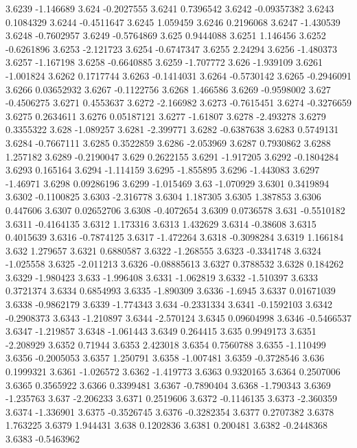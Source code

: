 3.6239  -1.146689
3.624  -0.2027555
3.6241  0.7396542
3.6242  -0.09357382
3.6243  0.1084329
3.6244  -0.4511647
3.6245  1.059459
3.6246  0.2196068
3.6247  -1.430539
3.6248  -0.7602957
3.6249  -0.5764869
3.625  0.9444088
3.6251  1.146456
3.6252  -0.6261896
3.6253  -2.121723
3.6254  -0.6747347
3.6255  2.24294
3.6256  -1.480373
3.6257  -1.167198
3.6258  -0.6640885
3.6259  -1.707772
3.626  -1.939109
3.6261  -1.001824
3.6262  0.1717744
3.6263  -0.1414031
3.6264  -0.5730142
3.6265  -0.2946091
3.6266  0.03652932
3.6267  -0.1122756
3.6268  1.466586
3.6269  -0.9598002
3.627  -0.4506275
3.6271  0.4553637
3.6272  -2.166982
3.6273  -0.7615451
3.6274  -0.3276659
3.6275  0.2634611
3.6276  0.05187121
3.6277  -1.61807
3.6278  -2.493278
3.6279  0.3355322
3.628  -1.089257
3.6281  -2.399771
3.6282  -0.6387638
3.6283  0.5749131
3.6284  -0.7667111
3.6285  0.3522859
3.6286  -2.053969
3.6287  0.7930862
3.6288  1.257182
3.6289  -0.2190047
3.629  0.2622155
3.6291  -1.917205
3.6292  -0.1804284
3.6293  0.165164
3.6294  -1.114159
3.6295  -1.855895
3.6296  -1.443083
3.6297  -1.46971
3.6298  0.09286196
3.6299  -1.015469
3.63  -1.070929
3.6301  0.3419894
3.6302  -0.1100825
3.6303  -2.316778
3.6304  1.187305
3.6305  1.387853
3.6306  0.447606
3.6307  0.02652706
3.6308  -0.4072654
3.6309  0.0736578
3.631  -0.5510182
3.6311  -0.4164135
3.6312  1.173316
3.6313  1.432629
3.6314  -0.38608
3.6315  0.4015639
3.6316  -0.7874125
3.6317  -1.472264
3.6318  -0.3098284
3.6319  1.166184
3.632  1.279657
3.6321  0.6880587
3.6322  -1.268555
3.6323  -0.3341748
3.6324  -1.025558
3.6325  -2.011213
3.6326  -0.08885613
3.6327  0.3788532
3.6328  0.184262
3.6329  -1.980423
3.633  -1.996408
3.6331  -1.062819
3.6332  -1.510397
3.6333  0.3721374
3.6334  0.6854993
3.6335  -1.890309
3.6336  -1.6945
3.6337  0.01671039
3.6338  -0.9862179
3.6339  -1.774343
3.634  -0.2331334
3.6341  -0.1592103
3.6342  -0.2908373
3.6343  -1.210897
3.6344  -2.570124
3.6345  0.09604998
3.6346  -0.5466537
3.6347  -1.219857
3.6348  -1.061443
3.6349  0.264415
3.635  0.9949173
3.6351  -2.208929
3.6352  0.71944
3.6353  2.423018
3.6354  0.7560788
3.6355  -1.110499
3.6356  -0.2005053
3.6357  1.250791
3.6358  -1.007481
3.6359  -0.3728546
3.636  0.1999321
3.6361  -1.026572
3.6362  -1.419773
3.6363  0.9320165
3.6364  0.2507006
3.6365  0.3565922
3.6366  0.3399481
3.6367  -0.7890404
3.6368  -1.790343
3.6369  -1.235763
3.637  -2.206233
3.6371  0.2519606
3.6372  -0.1146135
3.6373  -2.360359
3.6374  -1.336901
3.6375  -0.3526745
3.6376  -0.3282354
3.6377  0.2707382
3.6378  1.763225
3.6379  1.944431
3.638  0.1202836
3.6381  0.200481
3.6382  -0.2448368
3.6383  -0.5463962
